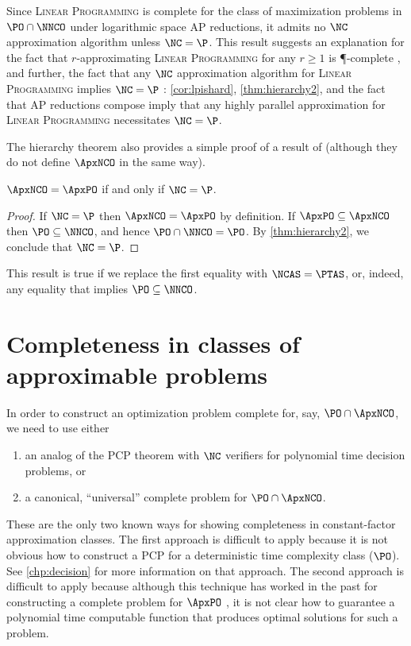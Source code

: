 Since \textsc{Linear Programming} is complete for the class of maximization problems in $\PO \cap \NNCO$ under logarithmic space AP reductions, it admits no $\NC$ approximation algorithm unless $\NC = \P$.
This result suggests an explanation for the fact that $r$-approximating \textsc{Linear Programming} for any $r \geq 1$ is \P-complete \cite[Theorem~8.2.7]{dsst97}, and further, the fact that any $\NC$ approximation algorithm for \textsc{Linear Programming} implies $\NC = \P$ \cite[Theorem~8.2.8]{dsst97}: \autoref{cor:lpishard}, \autoref{thm:hierarchy2}, and the fact that AP reductions compose imply that any highly parallel approximation for \textsc{Linear Programming} necessitates $\NC = \P$.

The hierarchy theorem also provides a simple proof of a result of \cite{dsst97} (although they do not define $\ApxNCO$ in the same way).

\begin{corollary}
  $\ApxNCO = \ApxPO$ if and only if $\NC = \P$.
\end{corollary}
\begin{proof}
  If $\NC = \P$ then $\ApxNCO = \ApxPO$ by definition.
  If $\ApxPO \subseteq \ApxNCO$ then $\PO \subseteq \NNCO$, and hence $\PO \cap \NNCO = \PO$.
  By \autoref{thm:hierarchy2}, we conclude that $\NC = \P$.
\end{proof}

This result is true if we replace the first equality with $\NCAS = \PTAS$, or, indeed, any equality that implies $\PO \subseteq \NNCO$.

\section{Completeness in classes of approximable problems}
\label{sec:apxncocomplete}

In order to construct an optimization problem complete for, say, $\PO \cap \ApxNCO$, we need to use either
\begin{enumerate}
\item an analog of the PCP theorem with $\NC$ verifiers for polynomial time decision problems, or
\item a canonical, ``universal'' complete problem for $\PO \cap \ApxNCO$.
\end{enumerate}
These are the only two known ways for showing completeness in constant-factor approximation classes.
The first approach is difficult to apply because it is not obvious how to construct a PCP for a deterministic time complexity class ($\PO$).
See \autoref{chp:decision} for more information on that approach.
The second approach is difficult to apply because although this technique has worked in the past for constructing a complete problem for $\ApxPO$ \cite[Lemma~2]{cp91}, it is not clear how to guarantee a polynomial time computable function that produces optimal solutions for such a problem.

